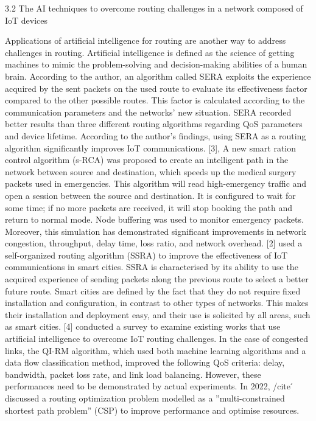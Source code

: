   3.2 The AI techniques to overcome routing challenges in a network composed of IoT devices 
  
Applications of artificial intelligence for routing are another way to address challenges in routing. Artificial intelligence
is defined as the science of getting machines to mimic the problem-solving and decision-making abilities of a human brain. 
According to the author, an algorithm called SERA exploits the experience acquired by the sent packets on the used route to 
evaluate its effectiveness factor compared to the other possible routes. This factor is calculated according to the 
communication parameters and the networks’ new situation. SERA recorded better results than three different routing
algorithms regarding QoS parameters and device lifetime. According to the author's findings, using SERA as a routing 
algorithm significantly improves IoT communications. [3], A new smart ration control algorithm (s-RCA) was proposed to 
create an intelligent path in the network between source and destination, which speeds up the medical surgery packets 
used in emergencies. This algorithm will read high-emergency traffic and open a session between the source and destination.
It is configured to wait for some time; if no more packets are received, it will stop booking the path and return to normal
 mode. Node buffering was used to monitor emergency packets. Moreover, this simulation has demonstrated significant 
improvements in network congestion, throughput, delay time, loss ratio, and network overhead. [2] used a self-organized 
routing algorithm (SSRA) to improve the effectiveness of IoT communications in smart cities. SSRA is characterised by its 
ability to use the acquired experience of sending packets along the previous route to select a better future route. 
Smart cities are defined by the fact that they do not require fixed installation and configuration, in contrast to other 
types of networks. This makes their installation and deployment easy, and their use is solicited by all areas, such as 
smart cities. [4] conducted a survey to examine existing works that use artificial intelligence to overcome IoT routing 
challenges. In the case of congested links, the QI-RM algorithm, which used both machine learning algorithms and a data 
flow classification method, improved the following QoS criteria: delay, bandwidth, packet loss rate, and link load 
balancing. However, these performances need to be demonstrated by actual experiments. In 2022, /cite ́ discussed a routing 
optimization problem modelled as a ”multi-constrained shortest path problem” (CSP) to improve performance and optimise resources.
